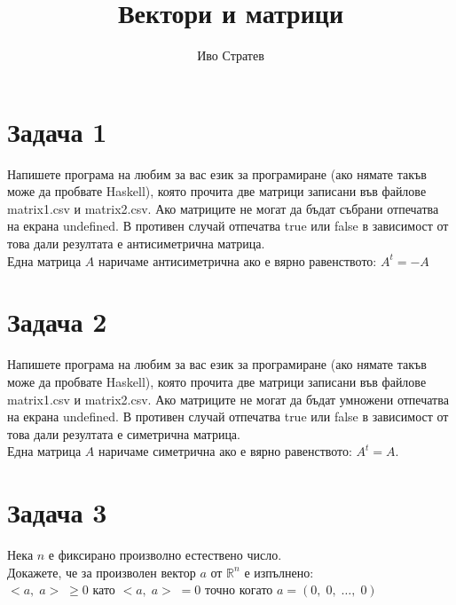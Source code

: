 \documentclass[12pt]{article}
\title{Вектори и матрици}
\author{Иво Стратев}
\newcommand{\R}{\mathbb{R}}
\begin{document}
\maketitle

\section*{Задача 1}

Напишете програма на любим за вас език за програмиране (ако нямате такъв може да пробвате Haskell),
която прочита две матрици записани във файлове matrix1.csv и matrix2.csv. Ако матриците не могат да бъдат събрани
отпечатва на екрана undefined. В противен случай отпечатва true или false в зависимост от това дали
резултата е антисиметрична матрица. \\

Една матрица $A$ наричаме антисиметрична ако е вярно равенството: $A^t = -A$
\section*{Задача 2}

Напишете програма на любим за вас език за програмиране (ако нямате такъв може да пробвате Haskell),
която прочита две матрици записани във файлове matrix1.csv и matrix2.csv. Ако матриците не могат да бъдат умножени
отпечатва на екрана undefined. В противен случай отпечатва true или false в зависимост от това дали
резултата е симетрична матрица. \\

Една матрица $A$ наричаме симетрична ако е вярно равенството: $A^t = A$.

\section*{Задача 3}

Нека $n$ е фиксирано произволно естествено число. \\

Докажете, че за произволен вектор $a$ от $\R^n$ е изпълнено: \\

$<a, \; a> \; \geq 0$ като $<a, \; a> \; = 0$ точно когато $a = (0, \; 0, \; \dots, \; 0)$
\end{document}
